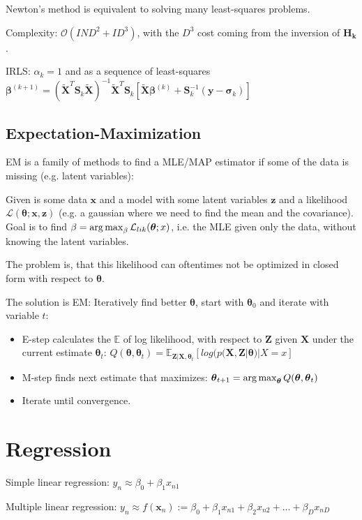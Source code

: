 \documentclass[10pt,a4paper,landscape]{article}
\renewcommand{\bf}[1]{\ensuremath{\mathbf{#1}}}
\newcommand{\bbeta}{\boldsymbol\beta}
\newcommand{\btheta}{\boldsymbol\theta}
\begin{document}
\begin{multicols*}{4}
Newton's method is equivalent to solving many least-squares problems.

Complexity: $\mathcal{O}(I N D^2 + I D^3)$, with the $D^3$ cost coming from the inversion of $\bf{H_k}$.

IRLS: $\alpha_k = 1$ and as a sequence of least-squares $\bbeta^{(k+1)} = (\tilde{\bf{X}}^T \bf{S}_k \tilde{\bf{X}})^{-1} \tilde{\bf{X}}^T \bf{S}_k 
[\tilde{\bf{X}} \bbeta^{(k)} + \bf{S}_k^{-1} (\bf{y} - \bf{\sigma}_k)]$

\subsection{Expectation-Maximization}
EM is a family of methods to find a MLE/MAP estimator if some of the data is missing (e.g. latent variables):

Given is some data $\bf{x}$ and  a model with some latent variables $\bf{z}$ and a likelihood $\mathcal{L}(\btheta; \bf{x}, \bf{z})$ (e.g. a gaussian where we need to find the mean and the covariance).
Goal is to find $\beta = \argmax_{\beta} \mathcal{L}_{lik}(\btheta; x)$, i.e. the MLE given only the data, without knowing the latent variables.

The problem is, that this likelihood can oftentimes not be optimized in closed form with respect to $\btheta$.

The solution is EM: Iteratively find better $\btheta$, start with $\btheta_0$ and iterate with variable $t$:
\begin{itemize}
\item E-step calculates the $\mathbb{E}$ of log likelihood, with respect to $\bf{Z}$ given $\bf{X}$ under the current estimate $\btheta_t$: $Q(\btheta, \btheta_t) = \mathbb{E}_{\bf{Z}|\bf{X},\btheta_t} [ log ( p(\bf{X}, \bf{Z} | \btheta) | X = x ]$
\item M-step finds next estimate that maximizes: $\btheta_{t+1} = \argmax_{\btheta} Q(\btheta, \btheta_t)$
\item Iterate until convergence.
\end{itemize}

\section{Regression}
Simple linear regression: $y_n \approx \beta_0 + \beta_1 x_{n1}$

Multiple linear regression: $y_n \approx f(\bf{x}_n) := \beta_0 + \beta_1 x_{n1} + \beta_2 x_{n2} + ... + \beta_D x_{nD}$


\end{multicols*}
\end{document}
